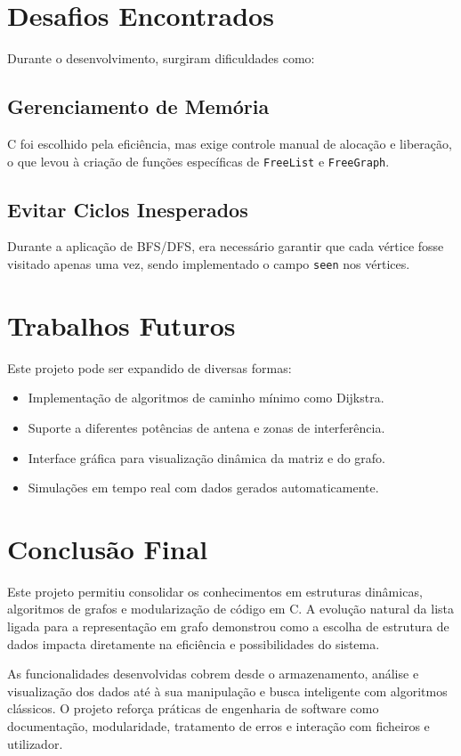 \documentclass[a4paper,12pt]{article}
\begin{document}
\newpage


\section{Desafios Encontrados}
Durante o desenvolvimento, surgiram dificuldades como:

\subsection{Gerenciamento de Memória}
C foi escolhido pela eficiência, mas exige controle manual de alocação e liberação, o que levou à criação de funções específicas de \texttt{FreeList} e \texttt{FreeGraph}.

\subsection{Evitar Ciclos Inesperados}
Durante a aplicação de BFS/DFS, era necessário garantir que cada vértice fosse visitado apenas uma vez, sendo implementado o campo \texttt{seen} nos vértices.

\section{Trabalhos Futuros}
Este projeto pode ser expandido de diversas formas:
\begin{itemize}
    \item Implementação de algoritmos de caminho mínimo como Dijkstra.
    \item Suporte a diferentes potências de antena e zonas de interferência.
    \item Interface gráfica para visualização dinâmica da matriz e do grafo.
    \item Simulações em tempo real com dados gerados automaticamente.
\end{itemize}

\newpage


\section{Conclusão Final}
Este projeto permitiu consolidar os conhecimentos em estruturas dinâmicas, algoritmos de grafos e modularização de código em C. A evolução natural da lista ligada para a representação em grafo demonstrou como a escolha de estrutura de dados impacta diretamente na eficiência e possibilidades do sistema.

As funcionalidades desenvolvidas cobrem desde o armazenamento, análise e visualização dos dados até à sua manipulação e busca inteligente com algoritmos clássicos. O projeto reforça práticas de engenharia de software como documentação, modularidade, tratamento de erros e interação com ficheiros e utilizador.
\end{document}
